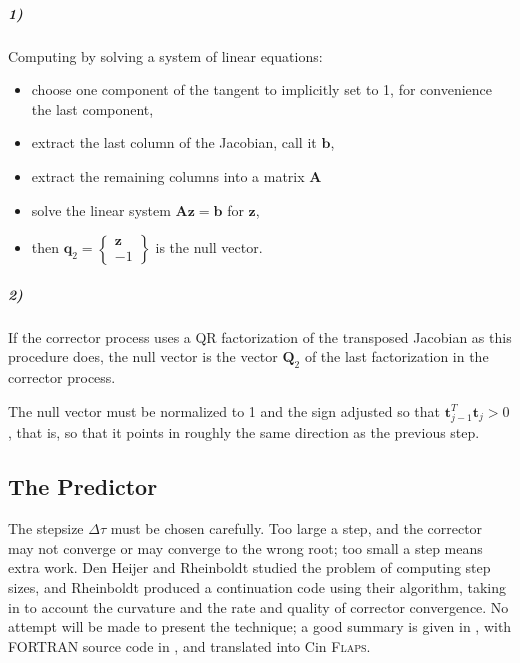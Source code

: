 \documentclass[10pt,openany,twoside]{book}
\numberwithin{equation}{section}   %
\newcommand{\Matrix}[1]{\boldsymbol{#1}}
\newcommand{\Vector}[1]{\boldsymbol{#1}}
\newcommand{\Flaps}{{\normalfont\scshape Flaps\:}}
\def\Cpp{{C\nolinebreak[4]\hspace{-.05em}\raisebox{.4ex}{\tiny\bf ++}}\:}
\newcommand{\Step}{\Delta\tau} %
\begin{document}
\subparagraph{1)} Computing by solving a system of linear equations:
\begin{itemize}
	\item choose one component of the tangent to implicitly set to 1, 
		for convenience the last component,
	\item extract the last column of the Jacobian, call it $\Vector{b}$,
	\item extract the remaining columns into a matrix $\Matrix{A}$
	\item solve the linear system $\Matrix{A}\Vector{z} = \Vector{b}$ for
		$\Vector{z}$,
	\item then $\Vector{q}_2 =
		\left\{ \begin{array}{c}
			\Vector{z} \\
			-1
		\end{array} \right\}$ is the null vector.
\end{itemize}

\subparagraph{2)} If the corrector process uses a QR factorization
of the transposed Jacobian as this procedure does, the null  
vector is the vector $\Vector{Q}_2$ of the last factorization in the
corrector process.

The null vector must be normalized to 1 and the sign adjusted so that
$\Vector{t}_{j-1}^T \Vector{t}_j > 0$, that is, so that it points in roughly the
same direction as the previous step.

\subsection{The Predictor}\label{sect:predictor}
The stepsize $\Step$ must be chosen carefully. Too large a step,
and the corrector may not converge or may converge to the wrong root;
too small a step means extra work. Den Heijer and Rheinboldt
\cite{denheijer1981steplength} studied the problem of computing
step sizes, and Rheinboldt \cite{rheinboldt1983locally}
produced a continuation code using their algorithm, taking in to account
the curvature and the rate and quality of corrector convergence.
No attempt will be made to present the technique; a good summary is given
in \cite{rheinboldt1986numerical}, with FORTRAN source code in \cite{pcon61},
and translated into \Cpp in \Flaps.
\end{document}
